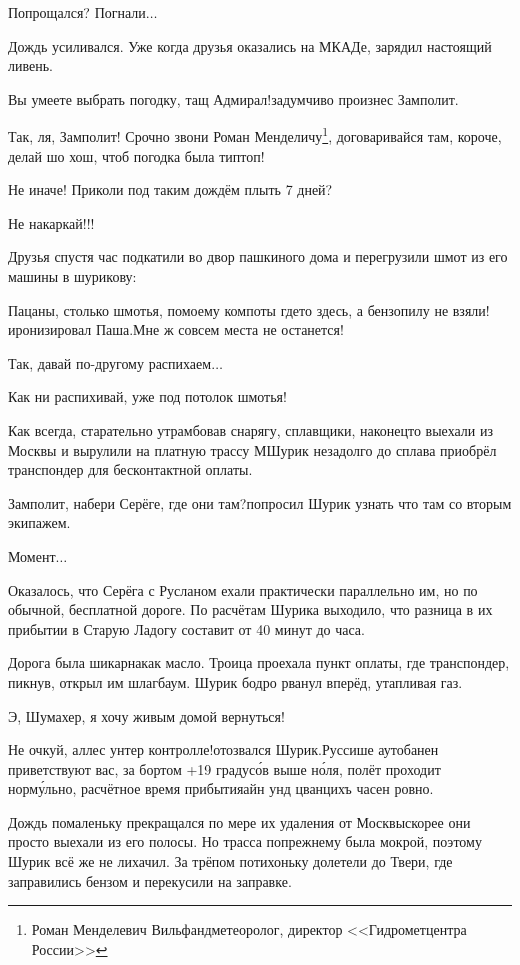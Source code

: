 \diagdash Попрощался? Погнали$\ldots$

Дождь усиливался. Уже когда друзья оказались на МКАДе, зарядил настоящий ливень.

\diagdash Вы умеете выбрать погодку, тащ Адмирал!\mdash задумчиво произнес Замполит. 

\diagdash Так, ля, Замполит! Срочно звони Роман Менделичу\footnote{Роман Менделевич Вильфанд\mdash метеоролог, директор <<Гидрометцентра России>>}, договаривайся там, короче, делай шо хош, чтоб погодка была тип\sdash топ!

\diagdash Не иначе! Приколи под таким дождём плыть 7 дней?

\diagdash Не накаркай!!!

Друзья спустя час подкатили во двор пашкиного дома и перегрузили шмот из его машины в шурикову:

\diagdash Пацаны, столько шмотья, по\sdash моему компоты где\sdash то здесь, а бензопилу не взяли!\mdash иронизировал Паша.\mdash Мне ж совсем места не останется!

\diagdash Так, давай по-другому распихаем$\ldots$

\diagdash Как ни распихивай, уже под потолок шмотья!

Как всегда, старательно утрамбовав снарягу, сплавщики, наконец\sdash то выехали из Москвы и вырулили на платную трассу М\mdash Шурик незадолго до сплава приобрёл транспондер для бесконтактной оплаты.

\diagdash Замполит, набери Серёге, где они там?\mdash попросил Шурик узнать что там со вторым экипажем.

\diagdash Момент$\ldots$

Оказалось, что Серёга с Русланом ехали практически параллельно им, но по обычной, бесплатной дороге. По расчётам Шурика выходило, что разница в их прибытии в Старую Ладогу составит от 40 минут до часа.

Дорога была шикарна\mdash как масло. Троица проехала пункт оплаты, где транспондер, пикнув, открыл им шлагбаум. Шурик бодро рванул вперёд, утапливая газ. 

\diagdash Э, Шумахер, я хочу живым домой вернуться!

\diagdash Не очкуй, аллес унтер контролле!\mdash отозвался Шурик.\mdash Руссише аутобанен приветствуют вас, за бортом +19 градус\'{о}в выше н\'{о}ля, полёт проходит норм\'{у}льно, расчётное время прибытия\mdash айн унд цванцихъ часен ровно.

Дождь помаленьку прекращался по мере их удаления от Москвы\mdash скорее они просто выехали из его полосы. Но трасса по\sdash прежнему была мокрой, поэтому Шурик всё же не лихачил. За трёпом потихоньку долетели до Твери, где заправились бензом и перекусили на заправке.

